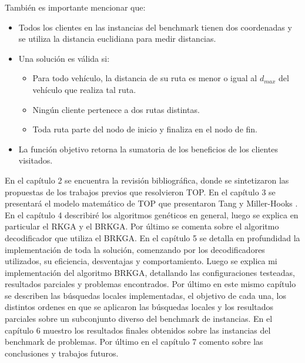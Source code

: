 \begin{minipage}{\textwidth}
También es importante mencionar que:

\begin{itemize}
	\item Todos los clientes en las instancias del benchmark tienen dos coordenadas y se utiliza la distancia euclidiana para medir distancias.
	\item Una solución es válida si:
	\begin{itemize}
		\item Para todo vehículo, la distancia de su ruta es menor o igual al $d_{max}$ del vehículo que realiza tal ruta.
		\item Ningún cliente pertenece a dos rutas distintas.
		\item Toda ruta parte del nodo de inicio y finaliza en el nodo de fin.
	\end{itemize}
	\item La función objetivo retorna la sumatoria de los beneficios de los clientes visitados.
\end{itemize}
\end{minipage}

\bigskip

En el capítulo 2 se encuentra la revisión bibliográfica, donde se sintetizaron las propuestas de los trabajos previos que resolvieron TOP.
En el capítulo 3 se presentará el modelo matemático de TOP que presentaron Tang y Miller-Hooks \cite{TangMillerHooks} .
En el capítulo 4 describiré los algoritmos genéticos en general, luego se explica en particular el RKGA y el BRKGA. Por último se comenta sobre el algoritmo decodificador que utiliza el BRKGA.
En el capítulo 5 se detalla en profundidad la implementación de toda la solución, comenzando por los decodificadores utilizados, su eficiencia, desventajas y comportamiento. Luego se explica mi implementación del algoritmo BRKGA, detallando las configuraciones testeadas, resultados parciales y problemas encontrados. Por último en este mismo capítulo se describen las búsquedas locales implementadas, el objetivo de cada una, los distintos ordenes en que se aplicaron las búsquedas locales y los resultados parciales sobre un subconjunto diverso del benchmark de instancias.
En el capítulo 6 muestro los resultados finales obtenidos sobre las instancias del benchmark de problemas.
Por último en el capítulo 7 comento sobre las conclusiones y trabajos futuros.


























